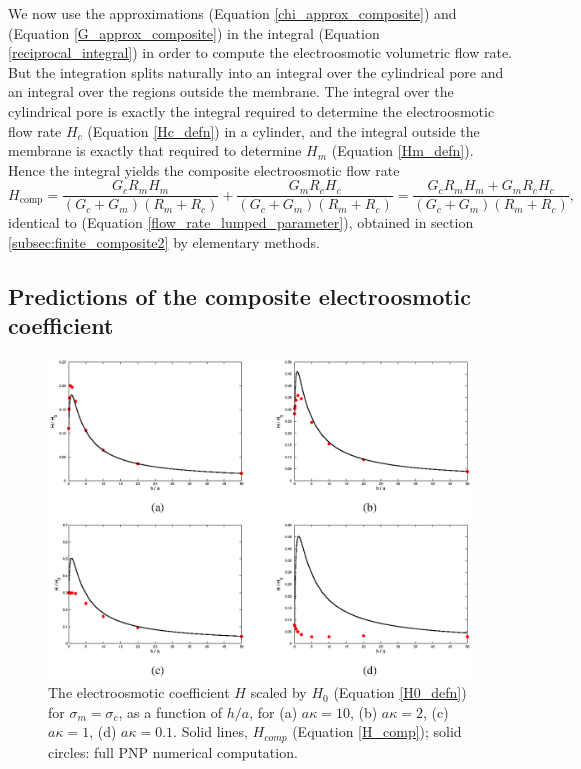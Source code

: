 We now use the approximations (Equation \ref{chi_approx_composite}) and
(Equation \ref{G_approx_composite}) in the integral (Equation \ref{reciprocal_integral}) in order to
compute the electroosmotic volumetric flow rate. But the integration
splits naturally into an integral over the cylindrical pore and an
integral over the regions outside the membrane. The integral over the
cylindrical pore is exactly the integral required to determine
the electroosmotic flow rate $H_c$ (Equation \ref{Hc_defn}) in a cylinder, and the
integral outside the membrane is exactly that required to determine
$H_m$ (Equation \ref{Hm_defn}). Hence the integral yields the composite
electroosmotic flow rate
\begin{equation}
H_\text{comp}= \frac{G_cR_mH_m}{(G_c+G_m)(R_m+R_c)}
+\frac{G_mR_cH_c}{(G_c+G_m)(R_m+R_c)}
=\frac{G_cR_mH_m+G_mR_cH_c}{(G_c+G_m)(R_m+R_c)},
\end{equation}
identical to (Equation \ref{flow_rate_lumped_parameter}), obtained in section \ref{subsec:finite_composite2} by
elementary methods.

\subsection{Predictions of the composite electroosmotic coefficient}
\begin{figure}[ht]
\includegraphics[width=\textwidth]{finite_thickness/finite_pore_pic3.eps}
\caption{\label{Fig:H_comp}
The electroosmotic coefficient $H$ scaled by $H_0$ (Equation \ref{H0_defn}) for
$\sigma_m=\sigma_c$, as a function of $h/a$, for
(a) $a\kappa=10$, (b) $a\kappa=2$, (c) $a\kappa=1$,
 (d) $a\kappa=0.1$.
Solid lines, $H_{comp}$ (Equation \ref{H_comp});
solid circles: full PNP numerical computation.}
\end{figure}

